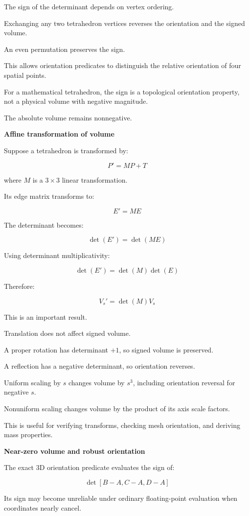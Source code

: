 The sign of the determinant depends on vertex ordering.

Exchanging any two tetrahedron vertices reverses the orientation and the signed volume.

An even permutation preserves the sign.

This allows orientation predicates to distinguish the relative orientation of four spatial points.

For a mathematical tetrahedron, the sign is a topological orientation property, not a physical volume with negative magnitude.

The absolute volume remains nonnegative.

\textbf{Affine transformation of volume}

Suppose a tetrahedron is transformed by:

\[
P'=MP+T
\]

where \(M\) is a \(3\times3\) linear transformation.

Its edge matrix transforms to:

\[
E'=ME
\]

The determinant becomes:

\[
\det(E')=\det(ME)
\]

Using determinant multiplicativity:

\[
\det(E')=\det(M)\det(E)
\]

Therefore:

\[
\boxed{ V_s'=\det(M)V_s }
\]

This is an important result.

Translation does not affect signed volume.

A proper rotation has determinant \(+1\), so signed volume is preserved.

A reflection has a negative determinant, so orientation reverses.

Uniform scaling by \(s\) changes volume by \(s^3\), including orientation reversal for negative \(s\).

Nonuniform scaling changes volume by the product of its axis scale factors.

This is useful for verifying transforms, checking mesh orientation, and deriving mass properties.

\textbf{Near-zero volume and robust orientation}

The exact 3D orientation predicate evaluates the sign of:

\[
\det[B-A,C-A,D-A]
\]

Its sign may become unreliable under ordinary floating-point evaluation when coordinates nearly cancel.

